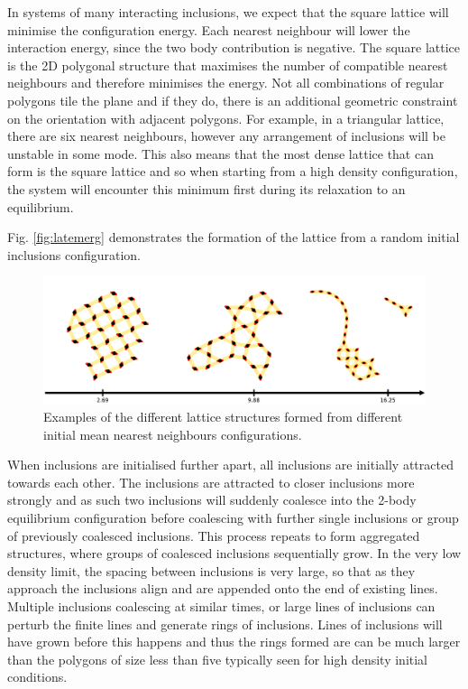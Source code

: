 In systems of many interacting inclusions, we expect that the square lattice will minimise the configuration energy. Each nearest neighbour will lower the interaction energy, since the two body contribution is negative. The square lattice is the 2D polygonal structure that maximises the number of compatible nearest neighbours and therefore minimises the energy. Not all combinations of regular polygons tile the plane and if they do, there is an additional geometric constraint on the orientation with adjacent polygons. For example, in a triangular lattice, there are six nearest neighbours, however any arrangement of inclusions will be unstable in some mode. This also means that the most dense lattice that can form is the square lattice and so when starting from a high density configuration, the system will encounter this minimum first during its relaxation to an equilibrium.

Fig. \ref{fig:latemerg} demonstrates the formation of the lattice from a random initial inclusions configuration.

\begin{figure}[h]
\centering
\includegraphics[width=15cm]{elastic_figs/different_starts_sample.pdf}
\caption{Examples of the different lattice structures formed from different initial mean nearest neighbours configurations. }
\end{figure}

When inclusions are initialised further apart, all inclusions are initially attracted towards each other. The inclusions are attracted to closer inclusions more strongly and as such two inclusions will suddenly coalesce into the 2-body equilibrium configuration before coalescing with further single inclusions or group of previously coalesced inclusions. This process repeats to form aggregated structures, where groups of coalesced inclusions sequentially grow. In the very low density limit, the spacing between inclusions is very large, so that as they approach the inclusions align and are appended onto the end of existing lines. Multiple inclusions coalescing at similar times, or large lines of inclusions  can perturb the finite lines and generate rings of inclusions. Lines of inclusions will have grown before this happens and thus the rings formed are can be much larger than the polygons of size less than five typically seen for high density initial conditions.

